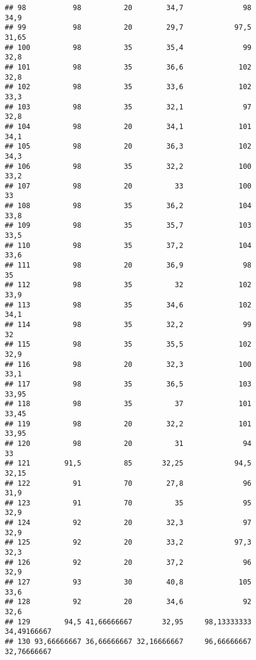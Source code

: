\documentclass[
]{article}
\begin{document}
\begin{verbatim}
## 98           98          20        34,7              98                 34,9
## 99           98          20        29,7            97,5                31,65
## 100          98          35        35,4              99                 32,8
## 101          98          35        36,6             102                 32,8
## 102          98          35        33,6             102                 33,3
## 103          98          35        32,1              97                 32,8
## 104          98          20        34,1             101                 34,1
## 105          98          20        36,3             102                 34,3
## 106          98          35        32,2             100                 33,2
## 107          98          20          33             100                   33
## 108          98          35        36,2             104                 33,8
## 109          98          35        35,7             103                 33,5
## 110          98          35        37,2             104                 33,6
## 111          98          20        36,9              98                   35
## 112          98          35          32             102                 33,9
## 113          98          35        34,6             102                 34,1
## 114          98          35        32,2              99                   32
## 115          98          35        35,5             102                 32,9
## 116          98          20        32,3             100                 33,1
## 117          98          35        36,5             103                33,95
## 118          98          35          37             101                33,45
## 119          98          20        32,2             101                33,95
## 120          98          20          31              94                   33
## 121        91,5          85       32,25            94,5                32,15
## 122          91          70        27,8              96                 31,9
## 123          91          70          35              95                 32,9
## 124          92          20        32,3              97                 32,9
## 125          92          20        33,2            97,3                 32,3
## 126          92          20        37,2              96                 32,9
## 127          93          30        40,8             105                 33,6
## 128          92          20        34,6              92                 32,6
## 129        94,5 41,66666667       32,95     98,13333333          34,49166667
## 130 93,66666667 36,66666667 32,16666667     96,66666667          32,76666667

\end{verbatim}
\end{document}
